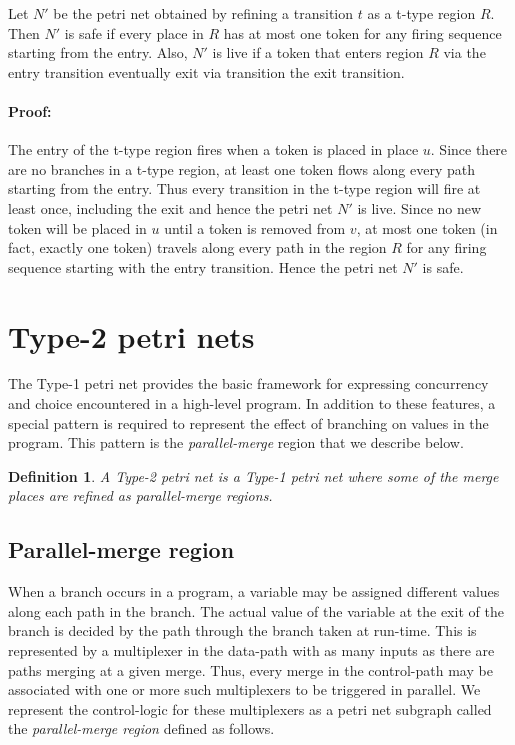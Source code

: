 \documentclass[12pt,a4paper]{article}
\newtheorem{definition}{Definition}
\begin{document}
Let $N'$ be the petri net obtained by refining a transition $t$ as a
t-type region $R$. Then $N'$ is safe if every place in $R$ has at most
one token for any firing sequence starting from the entry. Also, $N'$
is live if a token that enters region $R$ via the entry transition
eventually exit via transition the exit transition.

\paragraph{Proof:} The entry of the t-type region fires when a token
is placed in place $u$. Since there are no branches in a t-type
region, at least one token flows along every path starting from the
entry. Thus every transition in the t-type region will fire at least
once, including the exit and hence the petri net $N'$ is live. Since
no new token will be placed in $u$ until a token is removed from $v$,
at most one token (in fact, exactly one token) travels along every
path in the region $R$ for any firing sequence starting with the entry
transition. Hence the petri net $N'$ is safe.

\section{Type-2 petri nets}
\label{sec:type-2}

The Type-1 petri net provides the basic framework for expressing
concurrency and choice encountered in a high-level program. In
addition to these features, a special pattern is required to
represent the effect of branching on values in the program. This
pattern is the \emph{parallel-merge} region that we describe below.

\begin{definition}
  A \emph{Type-2 petri net} is a Type-1 petri net where some of the
  merge places are refined as parallel-merge regions.
\end{definition}

\subsection{Parallel-merge region}
\label{sec:parallel-merge}

When a branch occurs in a program, a variable may be assigned
different values along each path in the branch. The actual value of
the variable at the exit of the branch is decided by the path through
the branch taken at run-time. This is represented by a multiplexer in
the data-path with as many inputs as there are paths merging at a
given merge. Thus, every merge in the control-path may be associated
with one or more such multiplexers to be triggered in parallel. We
represent the control-logic for these multiplexers as a petri net
subgraph called the \emph{parallel-merge region} defined as follows.
\end{document}

